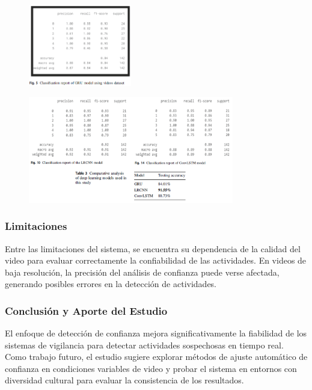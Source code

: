 \documentclass[listof=nochaptergap,12pt,times,authoryear]{report}
\begin{document}
\begin{figure}[h] %
    \centering
    \includegraphics[width=0.4\textwidth]{entre 3.2.png} %
    \label{fig:ejemplo} %
\end{figure}

\begin{figure}[h] %
    \centering
    \includegraphics[width=0.8\textwidth]{entre 3.3.png} %
    \label{fig:ejemplo} %
\end{figure}



\subsubsection{Limitaciones}
Entre las limitaciones del sistema, se encuentra su dependencia de la calidad del video para evaluar correctamente la confiabilidad de las actividades. En videos de baja resolución, la precisión del análisis de confianza puede verse afectada, generando posibles errores en la detección de actividades.

\subsubsection{Conclusión y Aporte del Estudio}
El enfoque de detección de confianza mejora significativamente la fiabilidad de los sistemas de vigilancia para detectar actividades sospechosas en tiempo real. Como trabajo futuro, el estudio sugiere explorar métodos de ajuste automático de confianza en condiciones variables de video y probar el sistema en entornos con diversidad cultural para evaluar la consistencia de los resultados.
\end{document}
